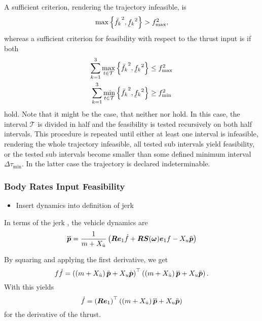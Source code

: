 A sufficient criterion, rendering the trajectory infeasible, is
\begin{equation}
	\label{eq:sufficient-infeasible-thrust}
	\max\left\{\fmaxaxis^2, \fminaxis^2\right\}
	> \fmaxsquare
	,
\end{equation}
whereas a sufficient criterion for feasibility with respect to the thrust input is if both
\begin{align}
	\label{eq:sufficient-feasible-thrust-max}
	\sum_{k=1}^{3}
	\max_{t \in \mathcal{T}}
	\left\{\fmaxaxis^2, \fminaxis^2\right\}
	& \leq
	\fmaxsquare \\
	\label{eq:sufficient-feasible-thrust-min}
	\sum_{k=1}^{3}
	\min_{t \in \mathcal{T}}
	\left\{\fmaxaxis^2, \fminaxis^2\right\}
	& \geq
	\fminsquare
\end{align}
hold. Note that it might be the case, that neither  nor  hold. In this case, the interval $\mathcal{T}$ is divided in half and the feasibility is tested recursively on both half intervals. This procedure is repeated until either at least one interval is infeasible, rendering the whole trajectory infeasible, all tested sub intervals yield feasibility, or the tested sub intervals become smaller than some defined minimum interval $\Delta\tau_{\text{min}}$. In the latter case the trajectory is declared indeterminable.


\subsubsection{Body Rates Input Feasibility}
\begin{itemize}
	\color{red}
	\item Insert dynamics into definition of jerk
\end{itemize}

In terms of the jerk \pbppp, the vehicle dynamics are 
\begin{equation}
	\label{eq:jerk}
	\mbox{$\dddot{\bm{p}}$} = 
	\frac{1}{m + X_{\dot{u}}}
	\left(
		\mbox{$\bm{R}$} \mbox{$\bm{e}$}_1 \mbox{$\dot{f}$} 
		+ \mbox{$\bm{R}$} \mbox{$\bm{S}$}(\mbox{$\bm{\omega}$})\mbox{$\bm{e}$}_1 f
		- X_u \mbox{$\ddot{\bm{p}}$}
	\right)
\end{equation}

By squaring  and applying the first derivative, we get
\begin{equation}
	f\mbox{$\dot{f}$} = 
	\left(
		\left(m + X_{\dot{u}}\right) \mbox{$\ddot{\bm{p}}$}
		+ X_u \mbox{$\dot{\bm{p}}$}
	\right)^\top
	\left(
		\left(m + X_{\dot{u}}\right) \mbox{$\dddot{\bm{p}}$}
		+ X_u \mbox{$\ddot{\bm{p}}$}
	\right).
\end{equation}
With  this yields
\begin{equation}
	\label{eq:fdot}
	\mbox{$\dot{f}$} = \left(\mbox{$\bm{R}$} \mbox{$\bm{e}$}_1\right)^\top
	\left(
		\left(m + X_{\dot{u}}\right) \mbox{$\dddot{\bm{p}}$}
		+ X_u \mbox{$\ddot{\bm{p}}$}
	\right)
\end{equation}
for the derivative of the thrust.


